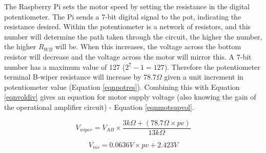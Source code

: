 \documentclass[twoside,a4]{report}
\def\br{\newline \newline \noindent}
\begin{document}
	
	\noindent
	The Raspberry Pi sets the motor speed by setting the resistance in the digital potentiometer. The Pi sends a 7-bit digital signal to the pot, indicating the resistance desired. Within the potentiometer is a network of resistors, and this number will determine the path taken through the circuit, the higher the number, the higher \(R_{WB}\) will be. When this increases, the voltage across the bottom resistor will decrease and the voltage across the motor will mirror this.\br
	A 7-bit number has a maximum value of 127 ($2^7 - 1 = 127$). Therefore the potentiometer terminal B-wiper resistance will increase by $78.7 \Omega$ given a unit increment in potentiometer value (Equation \ref{eqnpotres}). Combining this with Equation \ref{eqnvoldiv} gives an equation for motor supply voltage (also knowing the gain of the operational amplifier circuit) - Equation \ref{eqnmotsupvol}.
	
	\begin{equation}
	V_{wiper} = V_{AB}\times \frac{3k\Omega + \left(78.7\Omega \times pv\right)}{13k\Omega}
	\label{eqnpotres}
	\end{equation}
	
	
	\begin{equation}
	V_{ms} = 0.0636V \times pv + 2.423V
	\label{eqnmotsupvol}
	\end{equation}
	
\end{document}
